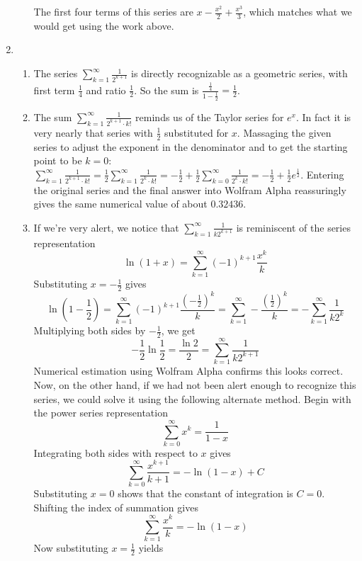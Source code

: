 \documentclass{article}
\begin{document}
\begin{enumerate}
\begin{enumerate}
        The first four terms of this series are $x-\frac{x^2}{2}+\frac{x^3}{3}$, which matches what we would get using the work above. 

    \end{enumerate}
    \item \begin{enumerate}
        \item The series $\sum_{k=1}^\infty \frac{1}{2^{k+1}}$ is directly recognizable as a geometric series, with first term $\frac{1}{4}$ and ratio $\frac{1}{2}$. So the sum is $\frac{\frac{1}{4}}{1-\frac{1}{2}} = \frac{1}{2}$.
        \item The sum  $\sum_{k=1}^\infty \frac{1}{2^{k+1}\cdot k!}$ reminds us of the Taylor series for $e^x$. In fact it is very nearly that series with $\frac{1}{2}$ substituted for $x$. Massaging the given series to adjust the exponent in the denominator and to get the starting point to be $k=0$:
         $\sum_{k=1}^\infty \frac{1}{2^{k+1}\cdot k!} = \frac{1}{2}\sum_{k=1}^\infty \frac{1}{2^{k}\cdot k!} = -\frac{1}{2}+\frac{1}{2}\sum_{k=0}^\infty \frac{1}{2^{k}\cdot k!} = -\frac{1}{2} + \frac{1}{2}e^{\frac{1}{2}}$. Entering the original series and the final answer into Wolfram Alpha reassuringly gives the same numerical value of about $0.32436$.
         \item If we're very alert, we notice that  $\sum_{k=1}^\infty \frac{1}{k2^{k+1}}$ is reminiscent of the series representation 
         $$\ln(1+x) = \sum_{k=1}^\infty (-1)^{k+1}\frac{x^k}{k}$$
         Substituting $x=-\frac{1}{2}$ gives
         $$\ln(1-\frac{1}{2}) = \sum_{k=1}^{\infty}(-1)^{k+1}\frac{(-\frac{1}{2})^k}{k}= \sum_{k=1}^{\infty}-\frac{(\frac{1}{2})^k}{k} = - \sum_{k=1}^{\infty}\frac{1}{k2^k}$$
         Multiplying both sides by $-\frac{1}{2}$, we get
         $$-\frac{1}{2}\ln{\frac{1}{2}} = \frac{\ln{2}}{2} =  \sum_{k=1}^{\infty}\frac{1}{k2^{k+1}}$$
         Numerical estimation using Wolfram Alpha confirms this looks correct.
         Now, on the other hand, if we had not been alert enough to recognize this series, we could solve it using the following alternate method. Begin with the power series representation $$ \sum_{k=0}^\infty x^k = \frac{1}{1-x}$$
         Integrating both sides with respect to $x$ gives
         $$ \sum_{k=0}^\infty \frac{x^{k+1}}{k+1} = -\ln{(1-x)}+C$$
         Substituting $x=0$ shows that the constant of integration is $C=0$. Shifting the index of summation gives
         $$ \sum_{k=1}^\infty \frac{x^{k}}{k} = -\ln{(1-x)}$$
         Now substituting $x=\frac{1}{2}$ yields

\end{enumerate}
\end{enumerate}
\end{document}
